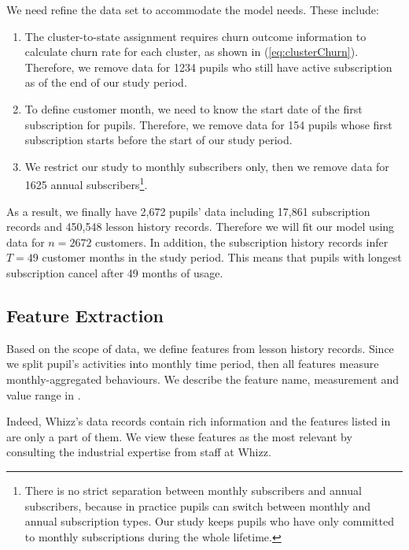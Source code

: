 We need refine the data set to accommodate the model needs. These include:
\begin{enumerate}
\item The cluster-to-state assignment requires churn outcome information to calculate churn rate for each cluster, as shown in (\ref{eq:clusterChurn}). Therefore, we remove data for 1234 pupils who still have active subscription as of the end of our study period.
\item To define customer month, we need to know the start date of the first subscription for pupils. Therefore, we remove data for 154 pupils whose first subscription starts before the start of our study period.
\item We restrict our study to monthly subscribers only, then we remove data for 1625 annual subscribers\footnote{There is no strict separation between monthly subscribers and annual subscribers, because in practice pupils can switch between monthly and annual subscription types. Our study keeps pupils who have only committed to monthly subscriptions during the whole lifetime.}. 
\end{enumerate}
As a result, we finally have 2,672 pupils' data including 17,861 subscription records and 450,548 lesson history records. Therefore we will fit our model using data for $n=2672$ customers. In addition, the subscription history records infer $T=49$ customer months in the study period. This means that pupils with longest subscription cancel after 49 months of usage.

\subsection{Feature Extraction}

Based on the scope of data, we define features from lesson history records. Since we split pupil's activities into monthly time period, then all features measure monthly-aggregated behaviours. We describe the feature name, measurement and value range in .

Indeed, Whizz's data records contain rich information and the features listed in  are only a part of them. We view these features as the most relevant by consulting the industrial expertise from staff at Whizz.

